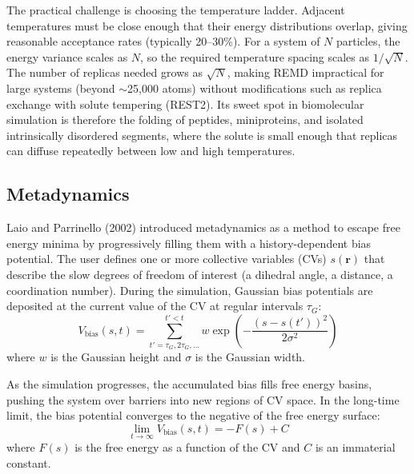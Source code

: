 The practical challenge is choosing the temperature ladder. Adjacent temperatures must be close enough that their energy distributions overlap, giving reasonable acceptance rates (typically 20--30\%). For a system of $N$ particles, the energy variance scales as $N$, so the required temperature spacing scales as $1/\sqrt{N}$. The number of replicas needed grows as $\sqrt{N}$, making REMD impractical for large systems (beyond $\sim$25,000 atoms) without modifications such as replica exchange with solute tempering (REST2). Its sweet spot in biomolecular simulation is therefore the folding of peptides, miniproteins, and isolated intrinsically disordered segments, where the solute is small enough that replicas can diffuse repeatedly between low and high temperatures.

\subsection{Metadynamics}
\label{sec:metadynamics}

Laio and Parrinello (2002) introduced metadynamics as a method to escape free energy minima by progressively filling them with a history-dependent bias potential. The user defines one or more collective variables (CVs) $s(\mathbf{r})$ that describe the slow degrees of freedom of interest (a dihedral angle, a distance, a coordination number). During the simulation, Gaussian bias potentials are deposited at the current value of the CV at regular intervals $\tau_G$:
\begin{equation}
\label{eq:metad-bias}
V_{\text{bias}}(s, t) = \sum_{t' = \tau_G, 2\tau_G, \ldots}^{t' < t} w \exp\!\left(-\frac{(s - s(t'))^2}{2\sigma^2}\right)
\end{equation}
where $w$ is the Gaussian height and $\sigma$ is the Gaussian width.

As the simulation progresses, the accumulated bias fills free energy basins, pushing the system over barriers into new regions of CV space. In the long-time limit, the bias potential converges to the negative of the free energy surface:
\begin{equation}
\label{eq:metad-fes}
\lim_{t \to \infty} V_{\text{bias}}(s, t) = -F(s) + C
\end{equation}
where $F(s)$ is the free energy as a function of the CV and $C$ is an immaterial constant.


